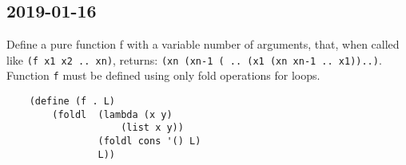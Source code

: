 \subsection{2019-01-16}
Define a pure function f with a variable number of arguments, that, when called like \texttt{(f x1 x2 .. xn)}, returns:
\texttt{(xn (xn-1 ( .. (x1 (xn xn-1 .. x1))..)}. Function \texttt{f} must be defined using only fold operations for loops.
\begin{lstlisting}
    (define (f . L)
        (foldl  (lambda (x y)
                    (list x y))
                (foldl cons '() L)
                L))
\end{lstlisting}
